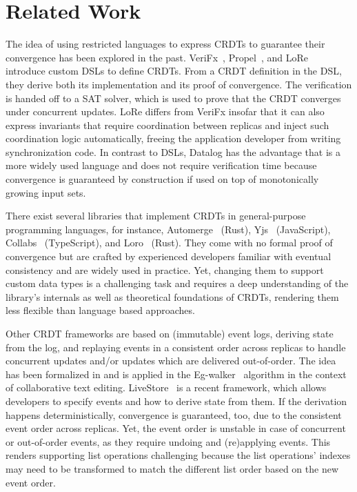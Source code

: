 \section{Related Work}\label{sec:related-work}

The idea of using restricted languages to express \acp{CRDT} to guarantee
their convergence has been explored in the past.
VeriFx~\cite{verifx}, Propel~\cite{propel}, and LoRe~\cite{lore} introduce
custom \acp{DSL} to define \acp{CRDT}.
From a \ac{CRDT} definition in the \ac{DSL},
they derive both its implementation and its proof of convergence.
The verification is handed off to a \acs{SAT} solver, which is used to
prove that the \ac{CRDT} converges under concurrent updates.
LoRe differs from VeriFx insofar that it can also express invariants that
require coordination between replicas and inject such coordination logic
automatically, freeing the application developer from writing synchronization
code.
In contrast to \acp{DSL}, Datalog has the advantage that is a more widely used
language and does not require verification time because convergence is
guaranteed by construction if used on top of monotonically growing input sets.

There exist several libraries that implement \acp{CRDT} in general-purpose
programming languages, for instance, Automerge~\cite{automerge} (Rust),
Yjs~\cite{yjs} (JavaScript), Collabs~\cite{collabs} (TypeScript),
and Loro~\cite{loro} (Rust).
They come with no formal proof of convergence but are crafted by experienced
developers familiar with eventual consistency and are widely used in practice.
Yet, changing them to support custom data types is a challenging task and
requires a deep understanding of the library's internals as well as theoretical
foundations of \acp{CRDT}, rendering them less flexible than language based
approaches.

Other \ac{CRDT} frameworks are based on (immutable) event logs, deriving state
from the log, and replaying events in a consistent order across replicas to
handle concurrent updates and/or updates which are delivered out-of-order.
The idea has been formalized in \cite{baquero2017pure} and is applied in
the Eg-walker~\cite{egwalker} algorithm in the context of collaborative text
editing.
LiveStore~\cite{livestore} is a recent framework, which allows developers
to specify events and how to derive state from them.
If the derivation happens deterministically, convergence is guaranteed, too,
due to the consistent event order across replicas.
Yet, the event order is unstable in case of concurrent or out-of-order events,
as they require undoing and (re)applying events.
This renders supporting list operations challenging because the list operations'
indexes may need to be transformed to match the different list order based on
the new event order.

